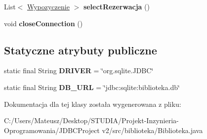 \begin{DoxyCompactItemize}
\item 
\hypertarget{classbiblioteka_1_1_biblioteka_a95c5a33e87a81142b908fc14cf2a97df}{}List$<$ \hyperlink{classmodel_1_1_wypozyczenie}{Wypozyczenie} $>$ {\bfseries select\+Rezerwacja} ()\label{classbiblioteka_1_1_biblioteka_a95c5a33e87a81142b908fc14cf2a97df}

\item 
\hypertarget{classbiblioteka_1_1_biblioteka_a576871df6ce74a8ab03d612d503fc1dc}{}void {\bfseries close\+Connection} ()\label{classbiblioteka_1_1_biblioteka_a576871df6ce74a8ab03d612d503fc1dc}

\end{DoxyCompactItemize}
\subsection*{Statyczne atrybuty publiczne}
\begin{DoxyCompactItemize}
\item 
\hypertarget{classbiblioteka_1_1_biblioteka_ae76ee0ce4adb34be329935dbdab51983}{}static final String {\bfseries D\+R\+I\+V\+E\+R} = \char`\"{}org.\+sqlite.\+J\+D\+B\+C\char`\"{}\label{classbiblioteka_1_1_biblioteka_ae76ee0ce4adb34be329935dbdab51983}

\item 
\hypertarget{classbiblioteka_1_1_biblioteka_a1dd6b10f95302c5cd0148aaee71bfb8d}{}static final String {\bfseries D\+B\+\_\+\+U\+R\+L} = \char`\"{}jdbc\+:sqlite\+:biblioteka.\+db\char`\"{}\label{classbiblioteka_1_1_biblioteka_a1dd6b10f95302c5cd0148aaee71bfb8d}

\end{DoxyCompactItemize}


Dokumentacja dla tej klasy została wygenerowana z pliku\+:\begin{DoxyCompactItemize}
\item 
C\+:/\+Users/\+Mateusz/\+Desktop/\+S\+T\+U\+D\+I\+A/\+Projekt-\/\+Inzynieria-\/\+Oprogramowania/\+J\+D\+B\+C\+Project v2/src/biblioteka/Biblioteka.\+java\end{DoxyCompactItemize}
